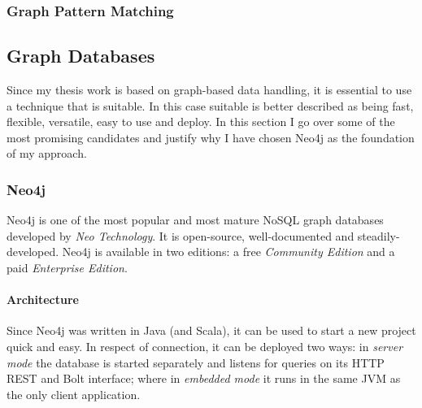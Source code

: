 \subsubsection{Graph Pattern Matching}


\subsection{Graph Databases}
\label{sect:graph-databases}
Since my thesis work is based on graph-based data handling, it is essential to use a technique that is suitable. In this case suitable is better described as being fast, flexible, versatile, easy to use and deploy. In this section I go over some of the most promising candidates and justify why I have chosen Neo4j as the foundation of my approach.

\subsubsection{Neo4j}
\label{sect:neo4j}
Neo4j is one of the most popular and most mature NoSQL graph databases developed by \emph{Neo Technology}. It is open-source, well-documented and steadily-developed. Neo4j is available in two editions: a free \emph{Community Edition} and a paid \emph{Enterprise Edition}.~\cite{neo4j}

\paragraph{Architecture}
Since Neo4j was written in Java (and Scala), it can be used to start a new project quick and easy. In respect of connection, it can be deployed two ways: in \emph{server mode} the database is started separately and listens for queries on its HTTP REST and Bolt interface; where in \emph{embedded mode} it runs in the same JVM as the only client application.

